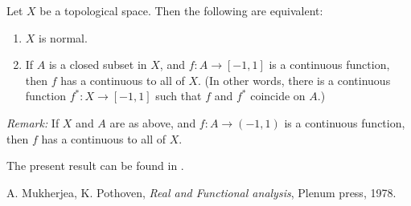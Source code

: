 \documentclass[12pt]{article}
\begin{document}
Let $X$ be a topological space. Then the following are equivalent:
\begin{enumerate}
\item $X$ is normal.
\item If $A$ is a closed subset in $X$, and $f\colon A\to [-1,1]$ is a
continuous function, then $f$ has a continuous 
 to all of $X$.
(In other words, there is a continuous function $f^\ast\colon X\to [-1,1]$ such that
$f$ and $f^\ast$ coincide on $A$.)
\end{enumerate}

\emph{Remark:}
If $X$ and $A$ are as above, and $f\colon A\to(-1,1)$ is a continuous function, then $f$ has a continuous  to all of $X$.

The present result can be found in \cite{mukherjea}.
\begin{thebibliography}{9}
A. Mukherjea, K. Pothoven,
\emph{Real and Functional analysis},
Plenum press, 1978.
\end{thebibliography}
\end{document}
